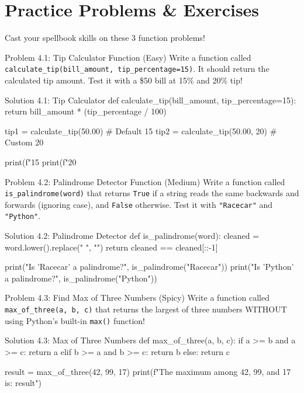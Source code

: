 \section{Practice Problems \& Exercises}

Cast your spellbook skills on these 3 function problems!

\begin{snakelab}{Problem 4.1: Tip Calculator Function (Easy)}
Write a function called \texttt{calculate\_tip(bill\_amount, tip\_percentage=15)}.
It should return the calculated tip amount. Test it with a \$50 bill at 15\% and 20\% tip!
\end{snakelab}

\begin{pycode}{Solution 4.1: Tip Calculator}
def calculate_tip(bill_amount, tip_percentage=15):
    return bill_amount * (tip_percentage / 100)

tip1 = calculate_tip(50.00)      # Default 15%
tip2 = calculate_tip(50.00, 20)  # Custom 20%

print(f"15%
print(f"20%
\end{pycode}

\begin{snakelab}{Problem 4.2: Palindrome Detector Function (Medium)}
Write a function called \texttt{is\_palindrome(word)} that returns \texttt{True} if a string reads the same backwards and forwards (ignoring case), and \texttt{False} otherwise.
Test it with \texttt{"Racecar"} and \texttt{"Python"}.
\end{snakelab}

\begin{pycode}{Solution 4.2: Palindrome Detector}
def is_palindrome(word):
    cleaned = word.lower().replace(" ", "")
    return cleaned == cleaned[::-1]

print("Is 'Racecar' a palindrome?", is_palindrome("Racecar"))
print("Is 'Python' a palindrome?", is_palindrome("Python"))
\end{pycode}

\begin{snakelab}{Problem 4.3: Find Max of Three Numbers (Spicy)}
Write a function called \texttt{max\_of\_three(a, b, c)} that returns the largest of three numbers WITHOUT using Python's built-in \texttt{max()} function!
\end{snakelab}

\begin{pycode}{Solution 4.3: Max of Three Numbers}
def max_of_three(a, b, c):
    if a >= b and a >= c:
        return a
    elif b >= a and b >= c:
        return b
    else:
        return c

result = max_of_three(42, 99, 17)
print(f"The maximum among 42, 99, and 17 is: {result}")
\end{pycode}
